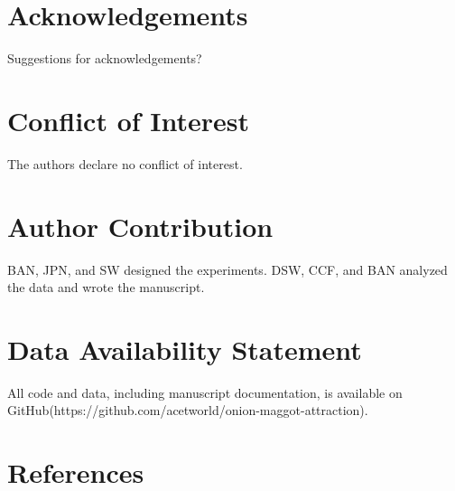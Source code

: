 \documentclass[alpha-refs]{wiley-article}
\begin{document}
\section*{Acknowledgements}
Suggestions for acknowledgements?

\section*{Conflict of Interest}
The authors declare no conflict of interest.  

\section*{Author Contribution}
BAN, JPN, and SW designed the experiments.  DSW, CCF, and BAN analyzed the data and wrote the manuscript.  


\section*{Data Availability Statement}
All code and data, including manuscript documentation, is available on GitHub(https://github.com/acetworld/onion-maggot-attraction).



\section{References}




\end{document}
